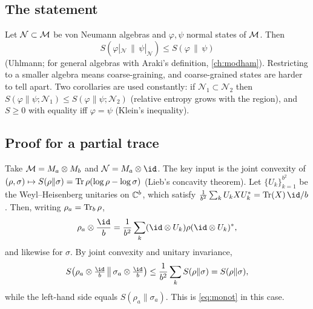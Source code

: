 \subsection{The statement}
Let $\mathcal N\subset\mathcal{M}$ be von Neumann algebras and $\varphi,\psi$ normal states of $\mathcal{M}$. Then
\begin{equation}
S(\varphi|_{\mathcal N}\,\|\,\psi|_{\mathcal N})\le S(\varphi\,\|\,\psi)\label{eq:monot}
\end{equation}
(Uhlmann; for general algebras with Araki's definition, \cref{ch:modham}). Restricting to a smaller algebra means coarse-graining, and coarse-grained states are harder to tell apart. Two corollaries are used constantly: if $\mathcal N_1\subset\mathcal N_2$ then $S(\varphi\|\psi;\mathcal N_1)\le S(\varphi\|\psi;\mathcal N_2)$ (relative entropy grows with the region), and $S\ge0$ with equality iff $\varphi=\psi$ (Klein's inequality).

\subsection{Proof for a partial trace}
Take $\mathcal{M}=M_a\otimes M_b$ and $\mathcal N=M_a\otimes\id$. The key input is the joint convexity of $(\rho,\sigma)\mapsto S(\rho\|\sigma)=\operatorname{Tr}\rho(\log\rho-\log\sigma)$ (Lieb's concavity theorem). Let $\{U_k\}_{k=1}^{b^2}$ be the Weyl--Heisenberg unitaries on $\mathbb{C}^b$, which satisfy $\frac1{b^2}\sum_kU_kXU_k^*=\Tr(X)\,\id/b$. Then, writing $\rho_a=\operatorname{Tr}_b\rho$,
\begin{equation}
\rho_a\otimes\frac{\id}b=\frac1{b^2}\sum_k(\id\otimes U_k)\rho(\id\otimes U_k)^*,
\end{equation}
and likewise for $\sigma$. By joint convexity and unitary invariance,
\begin{equation}
S\big(\rho_a\otimes\tfrac{\id}b\,\big\|\,\sigma_a\otimes\tfrac{\id}b\big)\le\frac1{b^2}\sum_kS(\rho\|\sigma)=S(\rho\|\sigma),
\end{equation}
while the left-hand side equals $S(\rho_a\|\sigma_a)$. This is \eqref{eq:monot} in this case.

